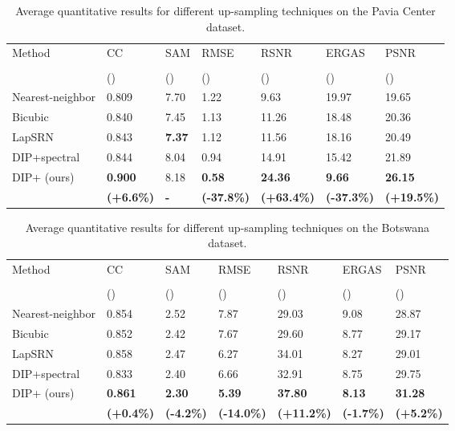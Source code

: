 \documentclass[journal]{IEEEtran}
\begin{document}
    
    \begin{table}[tb]
        \centering
        \caption{Average quantitative results for different up-sampling techniques on the Pavia Center dataset.}
        \begin{tabular}{lp{0.5cm}p{0.5cm}p{0.7cm}p{0.6cm}p{0.7cm}p{0.6cm}}
        \hline
        \multirow{3}{*}{Method} & CC   & SAM & RMSE  & RSNR   & ERGAS       & PSNR \\
        & & &  & & & \\
        & () & () & () & () & () & ()\\
        \hline
        Nearest-neighbor    & 0.809 & 7.70  & 1.22  & 9.63  & 19.97     & 19.65\\
        Bicubic             & 0.840 & 7.45  & 1.13  & 11.26 & 18.48     & 20.36\\
        LapSRN \cite{LapSRN}& 0.843 & \textbf{7.37} & 1.12 & 11.56 & 18.16 & 20.49\\
        DIP+spectral\cite{DHP-DARN} & 0.844  & 8.04   & 0.94   & 14.91 & 15.42 & 21.89\\
        DIP+ (ours)& \textbf{0.900}   & 8.18            & \textbf{0.58}     & \textbf{24.36}& \textbf{9.66}       & \textbf{26.15}\\
                            & \textbf{\tiny(+6.6\%)} & \textbf{-} & \textbf{\tiny (-37.8\%)} &    \textbf{\tiny (+63.4\%)} & \textbf{\tiny (-37.3\%)} & \textbf{\tiny (+19.5\%)} \\
        \hline
        \end{tabular}
        \label{tab:pavia_lambda_tune_qt}
    \end{table}
    \begin{table}[tb]
        \centering
        \caption{Average quantitative results for different up-sampling techniques on the Botswana dataset.}
        \begin{tabular}{lp{0.5cm}p{0.6cm}p{0.7cm}p{0.6cm}p{0.7cm}p{0.6cm}}
        \hline
        \multirow{3}{*}{Method} & CC   & SAM & RMSE  & RSNR   & ERGAS       & PSNR \\
        & & &  & & & \\
        & () & () & () & () & () & ()\\
        \hline
        Nearest-neighbor    & 0.854 & 2.52  & 7.87  & 29.03 & 9.08 & 28.87\\
        Bicubic             & 0.852 & 2.42  & 7.67  & 29.60 & 8.77 & 29.17\\
        LapSRN \cite{LapSRN}& 0.858 & 2.47  & 6.27  & 34.01 & 8.27 & 29.01\\
        DIP+spectral  \cite{DHP-DARN}  & 0.833 & 2.40  & 6.66   & 32.91 & 8.75  & 29.75\\
        DIP+ (ours)& \textbf{0.861}   & \textbf{2.30}   & \textbf{5.39}     & \textbf{37.80}    & \textbf{8.13}       & \textbf{31.28}\\
                            & \textbf{\tiny(+0.4\%)} &  \textbf{\tiny(-4.2\%)}          & \textbf{\tiny(-14.0\%)} &    \textbf{\tiny(+11.2\%)} & \textbf{\tiny(-1.7\%)} & \textbf{\tiny(+5.2\%)} \\
        \hline
        \end{tabular}
        \label{tab:botswana_lambda_tune_qt}
    \end{table}
\end{document}
